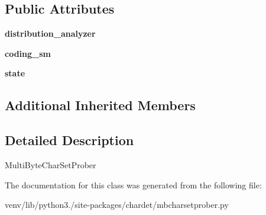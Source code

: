 \subsection*{Public Attributes}
\begin{DoxyCompactItemize}
\item 
\mbox{\label{classchardet_1_1mbcharsetprober_1_1_multi_byte_char_set_prober_a0d69c0ba6e6fbeafa35e7af4fcedb8f4}} 
{\bfseries distribution\+\_\+analyzer}
\item 
\mbox{\label{classchardet_1_1mbcharsetprober_1_1_multi_byte_char_set_prober_a74356d0fc55b5351d17bd3fc21b012df}} 
{\bfseries coding\+\_\+sm}
\item 
\mbox{\label{classchardet_1_1mbcharsetprober_1_1_multi_byte_char_set_prober_a189dfc8db2126ff84a28635a4580391d}} 
{\bfseries state}
\end{DoxyCompactItemize}
\subsection*{Additional Inherited Members}


\subsection{Detailed Description}
\begin{DoxyVerb}MultiByteCharSetProber
\end{DoxyVerb}
 

The documentation for this class was generated from the following file\+:\begin{DoxyCompactItemize}
\item 
venv/lib/python3./site-\/packages/chardet/mbcharsetprober.\+py\end{DoxyCompactItemize}
